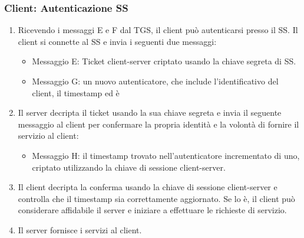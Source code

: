 \subsubsection{Client: Autenticazione SS}
\begin{enumerate}
    \item Ricevendo i messaggi E e F dal TGS, il client può autenticarsi presso il SS. Il client si connette al SS e invia i seguenti due messaggi:
    
    \begin{itemize}
        \item Messaggio E: Ticket client-server criptato usando la chiave segreta di SS.
        
        \item Messaggio G: un nuovo autenticatore, che include l'identificativo del client, il timestamp ed è
    \end{itemize}
    
    \item Il server decripta il ticket usando la sua chiave segreta e invia il seguente messaggio al client per confermare la propria identità e la volontà di fornire il servizio al client:
    
    \begin{itemize}
        \item Messaggio H: il timestamp trovato nell'autenticatore incrementato di uno, criptato utilizzando la chiave di sessione client-server.
    \end{itemize}
    
    \item Il client decripta la conferma usando la chiave di sessione client-server e controlla che il timestamp sia correttamente aggiornato. Se lo è, il client può considerare affidabile il server e iniziare a effettuare le richieste di servizio.
    
    \item Il server fornisce i servizi al client.
    
    
\end{enumerate}